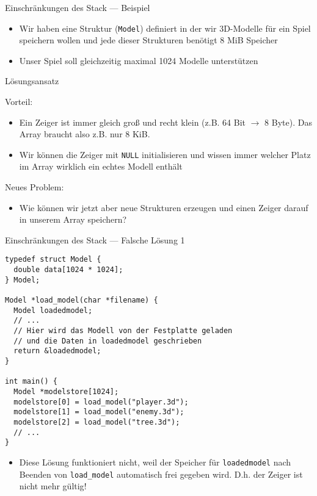 \documentclass[presentation]{beamer}
\begin{document}
\begin{frame}[label={sec:orgd256c66},fragile]{Einschränkungen des Stack --- Beispiel}
 \begin{itemize}
\item Wir haben eine Struktur ({\color{solarizedYellow}\verb!Model!}) definiert in der wir 3D-Modelle
für ein Spiel speichern wollen und jede dieser Strukturen benötigt
8 MiB Speicher
\item Unser Spiel soll gleichzeitig maximal 1024 Modelle unterstützen
\end{itemize}
\begin{exampleblock}{Lösungsansatz}
\begin{itemize}
\item Wir reservieren Speicher für 1024 \alert{Zeiger auf Modelle}: {\color{solarizedYellow}\texttt{Model*
  modelstore[1024];}
\end{itemize}
\alert{Vorteil:}
\begin{itemize}
\item Ein Zeiger ist immer gleich groß und recht klein (z.B. 64 Bit
\(\rightarrow\) 8 Byte). Das Array braucht also z.B. nur 8 KiB.
\item Wir können die Zeiger mit {\color{solarizedYellow}\verb!NULL!} initialisieren und wissen immer
welcher Platz im Array wirklich ein echtes Modell enthält
\end{itemize}
\alert{Neues Problem:}
\begin{itemize}
\item Wie können wir jetzt aber \alert{neue Strukturen erzeugen} und einen Zeiger
darauf in unserem Array speichern?
\end{itemize}
\end{exampleblock}
\end{frame}
\begin{frame}[label={sec:orgf3cc5fb},fragile]{Einschränkungen des Stack --- Falsche Lösung 1}
 \begin{verbatim}
typedef struct Model {
  double data[1024 * 1024];
} Model;

Model *load_model(char *filename) {
  Model loadedmodel;
  // ...
  // Hier wird das Modell von der Festplatte geladen
  // und die Daten in loadedmodel geschrieben
  return &loadedmodel;
}

int main() {
  Model *modelstore[1024];
  modelstore[0] = load_model("player.3d");
  modelstore[1] = load_model("enemy.3d");
  modelstore[2] = load_model("tree.3d");
  // ...
}
\end{verbatim}
\begin{itemize}
\item Diese Lösung funktioniert nicht, weil \alert{der Speicher} für
{\color{solarizedYellow}\verb!loadedmodel!} nach Beenden von {\color{solarizedYellow}\verb!load_model!} automatisch \alert{frei
gegeben wird}. D.h. \alert{der Zeiger ist nicht mehr gültig}!
\end{itemize}
\end{frame}
\end{document}
